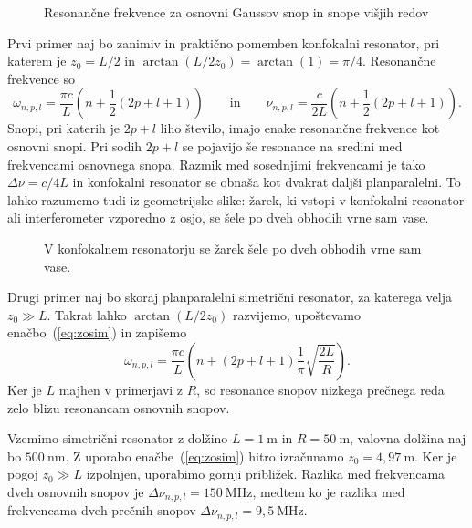\begin{figure}[h]
\centering
\def\svgwidth{110truemm} 

\caption{Resonančne frekvence za osnovni Gaussov snop in snope višjih redov}
\label{fig:crte}
\end{figure}
\pagebreak
Prvi primer naj bo zanimiv in praktično pomemben konfokalni 
resonator, pri katerem je $z_{0}=L/2$ in 
$\arctan(L/2z_{0})= \arctan(1)=\pi/4$. Resonančne frekvence so 
\begin{equation}
\omega_{n,p,l}=\frac{\pi c}{L}\left(n+\frac{1}{2}(2p+l+1)\right) \qquad \mathrm{in}
\qquad \nu_{n,p,l}=\frac{c}{2L}\left(n+\frac{1}{2}(2p+l+1)\right).
\label{eq:omega_konf}
\end{equation}
Snopi, pri katerih je $2p+l$ liho število, imajo enake resonančne frekvence kot
osnovni snopi. Pri sodih $2p+l$ se pojavijo še resonance na sredini
med frekvencami osnovnega snopa. Razmik med so\-sed\-nji\-mi frekvencami je tako $\Delta\nu=c/4L$
in konfokalni resonator se obnaša kot dvakrat daljši planparalelni.
To lahko razumemo tudi iz geometrijske slike: žarek, ki vstopi v konfokalni
resonator ali interferometer vzporedno z osjo, se šele po dveh obhodih vrne sam
vase.

\begin{figure}[h]
\centering
\def\svgwidth{55truemm} 

\caption{V konfokalnem resonatorju se žarek šele po dveh obhodih
vrne sam vase.}
\label{fig:Konfokalni_zarek}
\end{figure}

Drugi primer naj bo skoraj planparalelni 
simetrični resonator, za katerega velja $z_{0}\gg L$. Takrat lahko $\arctan(L/2z_{0})$ razvijemo, 
upoštevamo enačbo~(\ref{eq:zosim}) in zapišemo
\begin{equation}
\omega_{n,p,l}=\frac{\pi c}{L}\left(n+(2p+l+1)\frac{1}{\pi}\sqrt{\frac{2L}{R}}\right).
\end{equation}
Ker je $L$ majhen v primerjavi z $R$, so resonance snopov nizkega prečnega reda 
zelo blizu resonancam osnovnih snopov. 

Vzemimo 
simetrični resonator z dolžino $L=1~\si{\metre}$ in $R=50~\si{\metre}$, 
valovna dolžina naj bo $500~\si{\nano\metre}$. Z uporabo enačbe~(\ref{eq:zosim})
hitro izračunamo $z_0 = 4,97~\si{\metre}$. Ker je pogoj $z_0\gg L$ izpolnjen,  uporabimo
gornji približek. Razlika med frekvencama dveh osnovnih snopov je $\Delta \nu_{n,p,l} = 
150~\si{\mega\hertz}$, medtem ko je razlika med frekvencama dveh prečnih snopov
$\Delta \nu_{n,p,l} = 9,5~\si{\mega\hertz}$.

